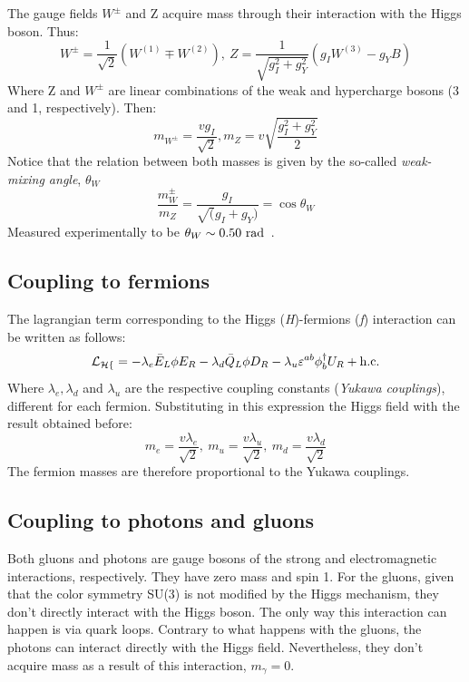 The gauge fields $W^\pm$ and Z acquire mass through their interaction with the Higgs boson. Thus:
\begin{equation}
W^\pm = \frac{1}{\sqrt{2}}(W^{(1)} \mp W^{(2)}), \ Z = \frac{1}{\sqrt{g_I^2 + g_Y^2}}(g_IW^{(3)} - g_Y B)
\end{equation}
Where Z and $W^\pm$ are linear combinations of the weak and hypercharge bosons (3 and 1, respectively). Then:
\begin{equation}
m_{W^\pm} = \frac{vg_I}{\sqrt{2}}, m_{Z} = v \sqrt{\frac{g_I^2 + g_Y^2}{2}}
\end{equation}
Notice that the relation between both masses is given by the so-called \textit{weak-mixing angle}, $\theta_W$
\begin{equation}
\frac{m_W^{\pm}}{m_Z} = \frac{g_I}{\sqrt(g_I + g_Y)} = \cos{\theta_W}
\end{equation}
Measured experimentally to be $\theta_W \sim 0.50 \ \rm rad$~\cite{PDG}. 

\subsection{Coupling to fermions}
The lagrangian term corresponding to the Higgs (\textit{H})-fermions (\textit{f}) interaction can be written as follows:
\begin{equation}
\mathcal{L_{Hf}} = - \lambda_e \bar{E}_L \phi E_R - \lambda_d \bar{Q}_L \phi D_{R} - \lambda_u \varepsilon^{ab} \phi_b^{\dagger}U_R + \rm h.c.
\end{equation}
Where $\lambda_e, \lambda_d$ and $\lambda_u$ are the respective coupling constants (\textit{Yukawa couplings}), different for each fermion. Substituting in this expression the Higgs field with the result obtained before:
\begin{equation}
m_e = \frac{v\lambda_e}{\sqrt{2}}, \ m_u = \frac{v\lambda_u}{\sqrt{2}}, \ m_d = \frac{v\lambda_d}{\sqrt{2}}
\end{equation}
The fermion masses are therefore proportional to the Yukawa couplings.

\subsection{Coupling to photons and gluons}
Both gluons and photons are gauge bosons of the strong and electromagnetic interactions, respectively. They have zero mass and spin 1. For the gluons, given that the color symmetry SU(3) is not modified by the Higgs mechanism, they don't directly interact with the Higgs boson. The only way this interaction can happen is via quark loops. 
Contrary to what happens with the gluons, the photons can interact directly with the Higgs field. Nevertheless, they don't acquire mass as a result of this interaction, $m_\gamma = 0$.  

